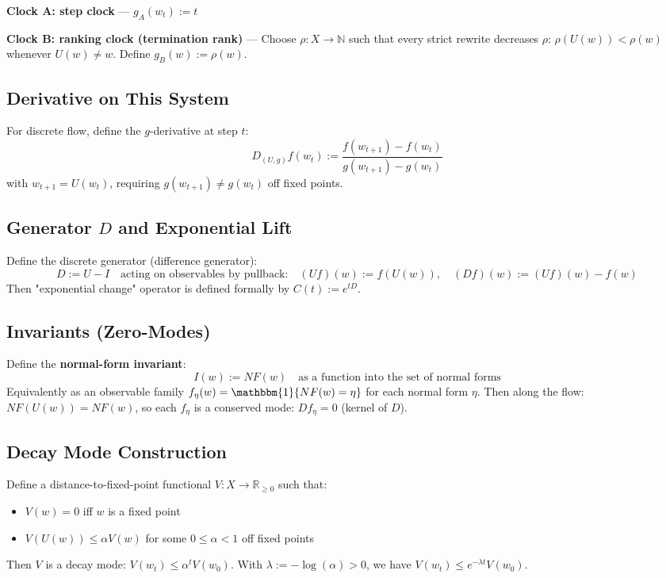 \documentclass[12pt, oneside]{article}
\begin{document}
\textbf{Clock A: step clock} — $g_A(w_t) := t$

\textbf{Clock B: ranking clock (termination rank)} — Choose $\rho: X \rightarrow \mathbb{N}$ such that every strict rewrite decreases $\rho$: $\rho(U(w)) < \rho(w)$ whenever $U(w) \neq w$. Define $g_B(w) := \rho(w)$.

\subsection{Derivative on This System}

For discrete flow, define the $g$-derivative at step $t$:
\begin{equation}
D_{(U,g)} f(w_t) := \frac{f(w_{t+1}) - f(w_t)}{g(w_{t+1}) - g(w_t)}
\end{equation}
with $w_{t+1} = U(w_t)$, requiring $g(w_{t+1}) \neq g(w_t)$ off fixed points.

\subsection{Generator $D$ and Exponential Lift}

Define the discrete generator (difference generator):
\begin{equation}
D := U - I \quad \text{acting on observables by pullback:} \quad (Uf)(w) := f(U(w)), \quad (Df)(w) := (Uf)(w) - f(w)
\end{equation}
Then "exponential change" operator is defined formally by $C(t) := e^{tD}$.

\subsection{Invariants (Zero-Modes)}

Define the \textbf{normal-form invariant}:
\begin{equation}
I(w) := NF(w) \quad \text{as a function into the set of normal forms}
\end{equation}
Equivalently as an observable family $f_\eta(w) = \mathbbm{1}\{NF(w) = \eta\}$ for each normal form $\eta$. Then along the flow: $NF(U(w)) = NF(w)$, so each $f_\eta$ is a conserved mode: $Df_\eta = 0$ (kernel of $D$).

\subsection{Decay Mode Construction}

Define a distance-to-fixed-point functional $V: X \rightarrow \mathbb{R}_{\geq 0}$ such that:
\begin{itemize}
    \item $V(w) = 0$ iff $w$ is a fixed point
    \item $V(U(w)) \leq \alpha V(w)$ for some $0 \leq \alpha < 1$ off fixed points
\end{itemize}
Then $V$ is a decay mode: $V(w_t) \leq \alpha^t V(w_0)$. With $\lambda := -\log(\alpha) > 0$, we have $V(w_t) \leq e^{-\lambda t} V(w_0)$.
\end{document}
